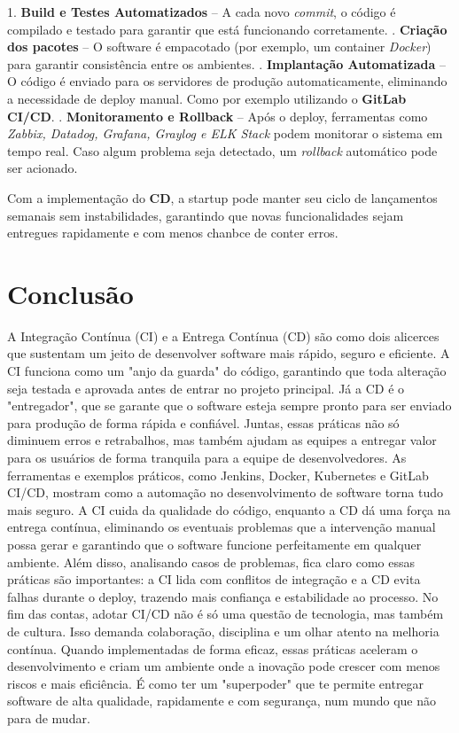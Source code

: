 \documentclass[a4paper,12pt]{article}
\begin{document}
1. \textbf{Build e Testes Automatizados} – A cada novo \textit{commit}, o código é compilado e testado para garantir que está funcionando corretamente.   . \textbf{Criação dos pacotes} – O software é empacotado (por exemplo, um container \textit{Docker}) para garantir consistência entre os ambientes.   . \textbf{Implantação Automatizada} – O código é enviado para os servidores de produção automaticamente, eliminando a necessidade de deploy manual. Como por exemplo utilizando o \textbf{GitLab CI/CD}.   . \textbf{Monitoramento e Rollback} – Após o deploy, ferramentas como \textit{Zabbix, Datadog, Grafana, Graylog e ELK Stack} podem monitorar o sistema em tempo real. Caso algum problema seja detectado, um \textit{rollback} automático pode ser acionado.   \newline

Com a implementação do \textbf{CD}, a startup pode manter seu ciclo de lançamentos semanais sem instabilidades, garantindo que novas funcionalidades sejam entregues rapidamente e com menos chanbce de conter erros.  


\newpage{}

\section*{Conclusão}

A Integração Contínua (CI) e a Entrega Contínua (CD) são como dois alicerces que sustentam um jeito de desenvolver software mais rápido, seguro e eficiente. A CI funciona como um "anjo da guarda" do código, garantindo que toda alteração seja testada e aprovada antes de entrar no projeto principal. Já a CD é o "entregador", que se garante que o software esteja sempre pronto para ser enviado para produção de forma rápida e confiável. Juntas, essas práticas não só diminuem erros e retrabalhos, mas também ajudam as equipes a entregar valor para os usuários de forma tranquila para a equipe de desenvolvedores.
As ferramentas e exemplos práticos, como Jenkins, Docker, Kubernetes e GitLab CI/CD, mostram como a automação no desenvolvimento de software torna tudo mais seguro. A CI cuida da qualidade do código, enquanto a CD dá uma força na entrega contínua, eliminando os eventuais problemas que a intervenção manual possa gerar e garantindo que o software funcione perfeitamente em qualquer ambiente. Além disso, analisando casos de problemas, fica claro como essas práticas são importantes: a CI lida com conflitos de integração e a CD evita falhas durante o deploy, trazendo mais confiança e estabilidade ao processo.
No fim das contas, adotar CI/CD não é só uma questão de tecnologia, mas também de cultura. Isso demanda colaboração, disciplina e um olhar atento na melhoria contínua. Quando implementadas de forma eficaz, essas práticas aceleram o desenvolvimento e criam um ambiente onde a inovação pode crescer com menos riscos e mais eficiência. É como ter um "superpoder" que te permite entregar software de alta qualidade, rapidamente e com segurança, num mundo que não para de mudar.
\end{document}
